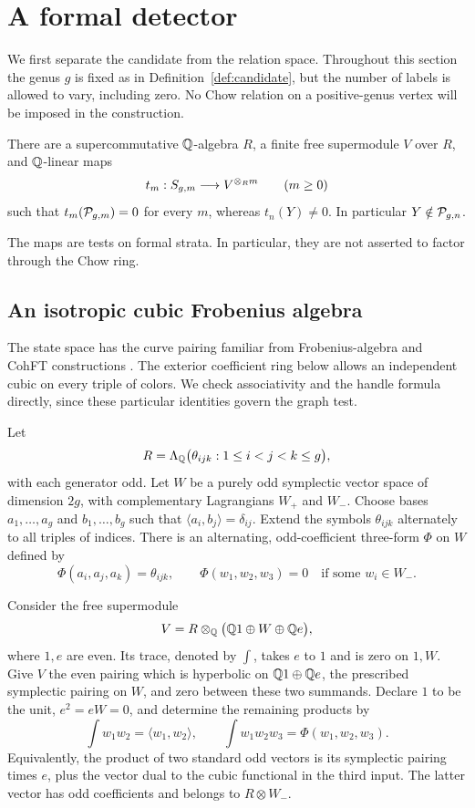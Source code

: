 \section{A formal detector}
\label{sec:detector}

We first separate the candidate from the relation space.  Throughout this
section the genus \(g\) is fixed as in Definition~\ref{def:candidate},
but the number of labels is allowed to vary, including zero.
No Chow relation on a positive-genus vertex will be imposed in the
construction.

\begin{proposition}
\label{prop:detector}
There are a supercommutative \(\mathbb Q\)-algebra \(R\), a finite free
supermodule \(V\) over \(R\), and \(\mathbb Q\)-linear maps
\[
 t_m:S_{g,m}\longrightarrow V^{\otimes_R m}
 \qquad(m\geq 0)
\]
such that \(t_m(\mathcal P_{g,m})=0\) for every \(m\), whereas
\(t_n(Y)\neq0\).  In particular \(Y\notin\mathcal P_{g,n}\).
\end{proposition}

The maps are tests on formal strata.  In particular, they are not
asserted to factor through the Chow ring.

\subsection{An isotropic cubic Frobenius algebra}

The state space has the curve pairing familiar from Frobenius-algebra
and CohFT constructions \cite{Abrams1996,PZ2019}. The exterior
coefficient ring below allows an independent cubic on every triple of
colors. We check associativity and the handle formula directly, since
these particular identities govern the graph test.

Let
\[
 R=\Lambda_{\mathbb Q}\bigl(\theta_{ijk}:1\leq i<j<k\leq g\bigr),
\]
with each generator odd.  Let \(W\) be a purely odd symplectic vector
space of dimension \(2g\), with complementary Lagrangians
\(W_+\) and \(W_-\).  Choose bases \(a_1,\ldots,a_g\) and
\(b_1,\ldots,b_g\) such that
\(\langle a_i,b_j\rangle=\delta_{ij}\).
Extend the symbols \(\theta_{ijk}\) alternately to all triples of
indices.  There is an alternating, odd-coefficient three-form
\(\Phi\) on \(W\) defined by
\[
 \Phi(a_i,a_j,a_k)=\theta_{ijk},
 \qquad
 \Phi(w_1,w_2,w_3)=0
 \quad\text{if some }w_i\in W_-.
\]

Consider the free supermodule
\[
 V=R\otimes_{\mathbb Q}\bigl(\mathbb Q1\oplus W\oplus\mathbb Q e\bigr),
\]
where \(1,e\) are even.  Its trace, denoted by \(\int\), takes \(e\)
to \(1\) and is zero on \(1,W\).  Give \(V\) the even pairing which
is hyperbolic on \(\mathbb Q1\oplus\mathbb Q e\), the prescribed symplectic pairing
on \(W\), and zero between these two summands.  Declare \(1\) to be
the unit, \(e^2=eW=0\), and determine the remaining products by
\[
 \int w_1w_2=\langle w_1,w_2\rangle,
 \qquad
 \int w_1w_2w_3=\Phi(w_1,w_2,w_3).
\]
Equivalently, the product of two standard odd vectors is its
symplectic pairing times \(e\), plus the vector dual to the cubic
functional in the third input.  The latter vector has odd
coefficients and belongs to \(R\otimes W_-\).

